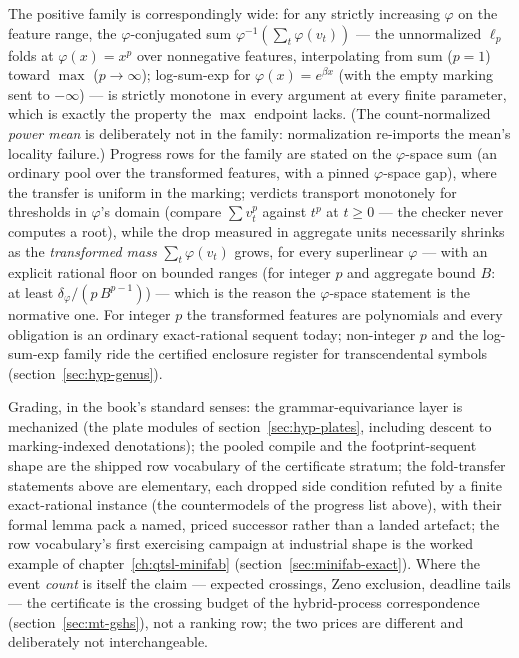 The positive family is correspondingly wide: for any strictly
increasing $\varphi$ on the feature range, the $\varphi$-conjugated
sum $\varphi^{-1}(\sum_t \varphi(v_t))$ --- the unnormalized
$\ell_p$ folds at $\varphi(x) = x^p$ over nonnegative features,
interpolating from sum ($p = 1$) toward $\max$ ($p \to \infty$);
log-sum-exp for $\varphi(x) = e^{\beta x}$ (with the empty marking
sent to $-\infty$) --- is strictly monotone in every argument at
every finite parameter, which is exactly the property the $\max$
endpoint lacks. (The count-normalized \emph{power mean} is
deliberately not in the family: normalization re-imports the mean's
locality failure.) Progress rows for the family are stated on the
$\varphi$-space sum (an ordinary pool over the transformed features,
with a pinned $\varphi$-space gap), where the transfer is uniform in
the marking; verdicts transport monotonely for thresholds in
$\varphi$'s domain (compare $\sum v_t^p$ against $t^p$ at $t \ge 0$
--- the checker never computes a root), while the drop measured in
aggregate units necessarily shrinks as the \emph{transformed mass}
$\sum_t \varphi(v_t)$ grows, for every superlinear $\varphi$ ---
with an explicit rational floor on bounded ranges (for integer $p$
and aggregate bound $B$: at least $\delta_\varphi / (p\,B^{p-1})$)
--- which is the reason the $\varphi$-space statement is the
normative one. For integer $p$ the transformed features are polynomials and
every obligation is an ordinary exact-rational sequent today;
non-integer $p$ and the log-sum-exp family ride the certified
enclosure register for transcendental symbols
(section~\ref{sec:hyp-genus}).

Grading, in the book's standard senses: the grammar-equivariance
layer is mechanized (the plate modules of
section~\ref{sec:hyp-plates}, including descent to marking-indexed
denotations); the pooled compile and the footprint-sequent shape are
the shipped row vocabulary of the certificate stratum; the
fold-transfer statements above are elementary, each dropped side
condition refuted by a finite exact-rational instance (the
countermodels of the progress list above), with their formal lemma
pack a named, priced successor rather than a landed artefact; the
row vocabulary's first exercising campaign at industrial shape is
the worked example of chapter~\ref{ch:qtsl-minifab}
(section~\ref{sec:minifab-exact}). Where
the event \emph{count} is itself the claim --- expected crossings,
Zeno exclusion, deadline tails --- the certificate is the crossing
budget of the hybrid-process correspondence
(section~\ref{sec:mt-gshs}), not a ranking row; the two prices are
different and deliberately not interchangeable.

